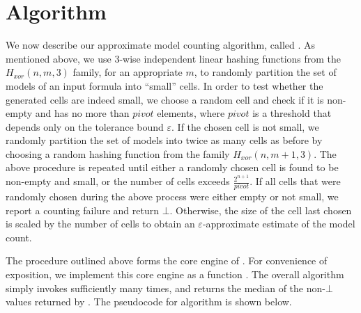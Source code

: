 \section{Algorithm} \label{sec:algo}
We now describe our approximate model counting algorithm, called
{\ApproxMC}.  %
%
%
%
As mentioned above, we use $3$-wise independent linear hashing
functions from the $H_{xor}(n, m, 3)$ family, for an appropriate $m$,
to randomly partition the set of models of an input formula into
``small'' cells.  In order to test whether the generated cells are
indeed small, we choose a random cell and check if it is non-empty and
has no more than $pivot$ elements, where $pivot$ is a threshold that
depends only on the tolerance bound $\varepsilon$.  If the chosen cell
is not small, we randomly partition the set of models into twice as
many cells as before by choosing a random hashing function from the
family $H_{xor}(n, m+1, 3)$.
%
%
%
The above procedure is repeated until either a randomly
chosen cell is found to be non-empty and small, or the number of
cells exceeds $\frac{2^{n+1}}{\mathit{pivot}}$.  If all cells
that were randomly chosen during the above process were either empty
or not small, we report a counting failure and return $\bot$.
Otherwise, the size of the cell last chosen is scaled by the number
of cells to obtain an $\varepsilon$-approximate estimate of the model count.  

The procedure outlined above forms the core engine of {\ApproxMC}. For
convenience of exposition, we implement this core engine as a function
{\ApproxMCCore}.  The overall {\ApproxMC} algorithm simply invokes
{\ApproxMCCore} sufficiently many times, and returns the median of the
non-$\bot$ values returned by {\ApproxMCCore}.  The pseudocode for
algorithm {\ApproxMC} is shown below.

